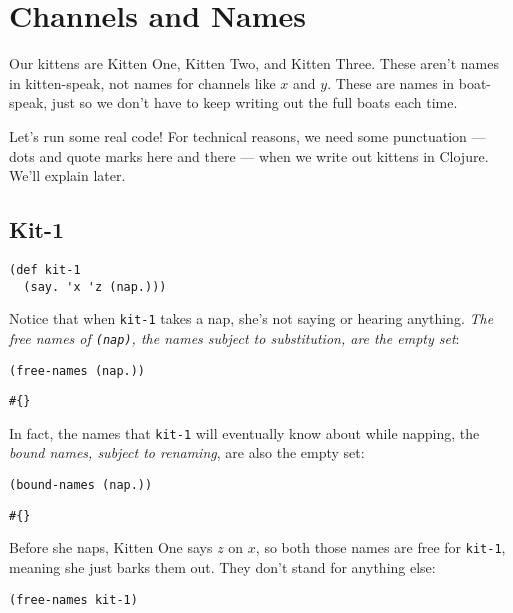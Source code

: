 \documentclass[10pt,oneside,x11names]{article}
\theoremstyle{definition}
\theoremstyle{warning}
\begin{document}
\newpage
\section{Channels and Names}
\label{sec:orgc2fdc3b}

Our kittens are Kitten One, Kitten Two, and Kitten Three. These
aren't names in kitten-speak, not names for channels like \(x\) and
\(y\). These are names in boat-speak, just so we don't have to keep
writing out the full boats each time.

Let's run some real code! For technical reasons, we need some
punctuation --- dots and quote marks here and there --- when we
write out kittens in Clojure. We'll explain later.

\subsection{Kit-1}
\label{sec:org3261e1c}

\vskip 0.26cm
\begin{verbatim}
(def kit-1
  (say. 'x 'z (nap.)))
\end{verbatim}

Notice that when \texttt{kit-1} takes a nap, she's not saying or hearing
anything. \emph{The free names of \texttt{(nap)}, the names subject to
substitution, are the empty set}:

\vskip 0.26cm
\begin{verbatim}
(free-names (nap.))
\end{verbatim}

\begin{verbatim}
#{}
\end{verbatim}


In fact, the names that \texttt{kit-1} will eventually know about while
napping, the \emph{bound names, subject to renaming}, are also the
empty set:

\vskip 0.26cm
\begin{verbatim}
(bound-names (nap.))
\end{verbatim}

\begin{verbatim}
#{}
\end{verbatim}


Before she naps, Kitten One says \(z\) on \(x\), so both those names
are free for \texttt{kit-1}, meaning she just barks them out. They don't
stand for anything else:

\vskip 0.26cm
\begin{verbatim}
(free-names kit-1)
\end{verbatim}
\end{document}
